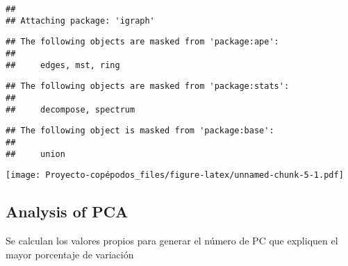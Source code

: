 \documentclass[]{article}
\newenvironment{Shaded}{\begin{snugshade}}{\end{snugshade}}
\newcommand{\DataTypeTok}[1]{\textcolor[rgb]{0.13,0.29,0.53}{#1}}
\newcommand{\DecValTok}[1]{\textcolor[rgb]{0.00,0.00,0.81}{#1}}
\newcommand{\KeywordTok}[1]{\textcolor[rgb]{0.13,0.29,0.53}{\textbf{#1}}}
\newcommand{\NormalTok}[1]{#1}
\newcommand{\OperatorTok}[1]{\textcolor[rgb]{0.81,0.36,0.00}{\textbf{#1}}}
\newcommand{\OtherTok}[1]{\textcolor[rgb]{0.56,0.35,0.01}{#1}}
\newcommand{\StringTok}[1]{\textcolor[rgb]{0.31,0.60,0.02}{#1}}
\begin{document}
\begin{verbatim}
## 
## Attaching package: 'igraph'
\end{verbatim}

\begin{verbatim}
## The following objects are masked from 'package:ape':
## 
##     edges, mst, ring
\end{verbatim}

\begin{verbatim}
## The following objects are masked from 'package:stats':
## 
##     decompose, spectrum
\end{verbatim}

\begin{verbatim}
## The following object is masked from 'package:base':
## 
##     union
\end{verbatim}

\begin{Shaded}
\end{Shaded}

\texttt{[image: Proyecto-copépodos\_files/figure-latex/unnamed-chunk-5-1.pdf]}

\hypertarget{analysis-of-pca}{%
\subsection{Analysis of PCA}\label{analysis-of-pca}}

Se calculan los valores propios para generar el número de PC que
expliquen el mayor porcentaje de variación
\end{document}
